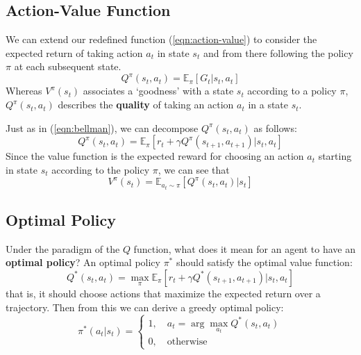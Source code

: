 \documentclass[journal, onecolumn, 12pt, draftclsnofoot]{IEEEtran}
\newcommand{\kword}[1]{\textbf{#1}}
\begin{document}
		\subsection{Action-Value Function}
		\par We can extend our redefined function (\ref{eqn:action-value}) to consider the expected return of taking action $a_t$ in state $s_t$ and from there following the policy $\pi$ at each subsequent state.
		\begin{equation}
			\label{eqn:action-value}
			Q^\pi(s_t,a_t) = \mathbb{E}_\pi \left[ G_t \big\vert s_t, a_t \right]
		\end{equation}
		Whereas $V^\pi(s_t)$ associates a `goodness' with a state $s_t$ according to a policy $\pi$, $Q^\pi(s_t,a_t)$ describes the \kword{quality} of taking an action $a_t$ in a state $s_t$.
		\par Just as in (\ref{eqn:bellman}), we can decompose $Q^\pi(s_t,a_t)$ as follows:
		\begin{equation}
			\label{eqn:q_bellman}
			Q^\pi(s_t,a_t) = \mathbb{E}_\pi \left[ r_t + \gamma Q^\pi(s_{t+1}, a_{t+1}) \big\vert s_t, a_t \right]
		\end{equation}
		Since the value function is the expected reward for choosing an action $a_t$ starting in state $s_t$ according to the policy $\pi$, we can see that
		\begin{equation}
			\label{eqn:value-as-expectation-over-action-value}
			V^\pi(s_t) = \mathbb{E}_{a_t \sim \pi} \left[ Q^\pi(s_t, a_t) \big\vert s_t \right]
		\end{equation}
		\subsection{Optimal Policy}
		\par Under the paradigm of the $Q$ function, what does it mean for an agent to have an \kword{optimal policy}? An optimal policy $\pi^*$ should satisfy the optimal value function:
		\begin{equation}
			\label{eqn:optimal-value-function}
			Q^*(s_t,a_t) = \max_{\pi} \mathbb{E}_\pi \left[ r_t + \gamma Q^*(s_{t+1}, a_{t+1}) \big\vert s_t, a_t \right]
		\end{equation}
		that is, it should choose actions that maximize the expected return over a trajectory. Then from this we can derive a greedy optimal policy:
		\begin{equation}
			\label{eqn:greedy_policy}
			\pi^*(a_t \big\vert s_t) = \begin{cases}
				1, \quad a_t = \arg \max_{a_t} Q^*(s_t, a_t) \\
				0, \quad \text{otherwise}
		\end{cases}
		\end{equation}
\end{document}
